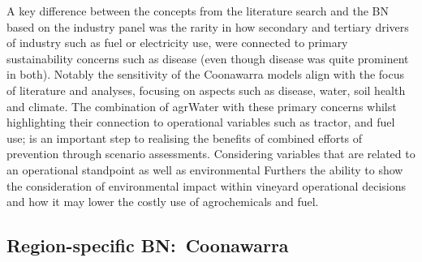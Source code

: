 \documentclass[10pt,letterpaper]{article}
\begin{document}
A key difference between the concepts from the literature search and the BN based on the industry panel was the rarity in how secondary and tertiary drivers of industry such as fuel or electricity use, were connected to primary sustainability concerns such as disease (even though disease was quite prominent in both). Notably the sensitivity of the Coonawarra models align with the focus of literature and analyses, focusing on  aspects such as disease, water, soil health and climate. The combination of agrWater with these primary concerns whilst highlighting their connection to operational variables such as tractor, and fuel use; is an important step to realising the benefits of combined efforts of prevention through scenario assessments. Considering variables that are related to an operational standpoint as well as environmental Furthers the ability to show the consideration of environmental impact within vineyard operational decisions and how it may lower the costly use of agrochemicals and fuel.


\subsection*{Region-specific BN:~Coonawarra}
\end{document}
